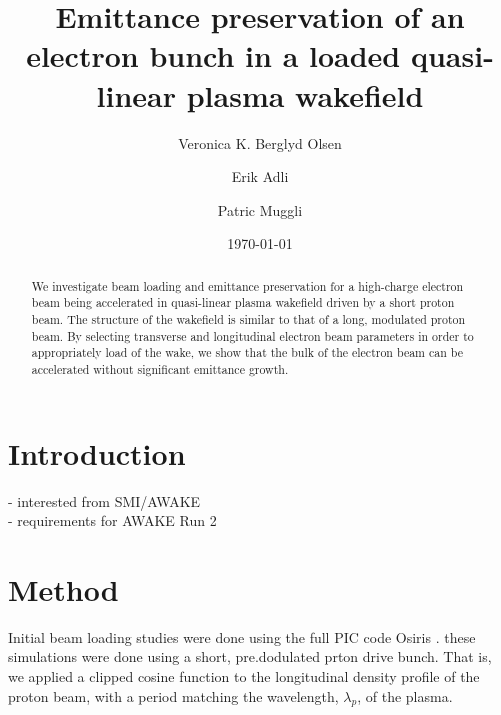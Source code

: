 \documentclass[aps,prstab,reprint,groupedaddress]{revtex4-1}
\begin{document}

\title{Emittance preservation of an electron bunch in a loaded quasi-linear plasma wakefield}

\author{Veronica K. Berglyd Olsen}

\author{Erik Adli}

\author{Patric Muggli}

\date{\today}

\begin{abstract}
We investigate beam loading and emittance preservation for a high-charge electron beam being accelerated in quasi-linear plasma wakefield driven by a short proton beam. The structure of the wakefield is similar to that of a long, modulated proton beam. By selecting transverse and longitudinal electron beam parameters in order to  appropriately load of the wake, we show that the bulk of the electron beam can be accelerated without significant emittance growth.
\end{abstract}

\maketitle

\section[\label{S:I}]{Introduction}

- interested from SMI/AWAKE \\
- requirements for AWAKE Run 2 \\

\section[\label{S:M}]{Method}

Initial beam loading studies were done using the full PIC code Osiris \cite{fonseca_osiris:_2002}. these simulations were done using a short, pre.dodulated prton drive bunch. That is, we applied a clipped cosine function to the longitudinal density profile of the proton beam, with a period matching the wavelength, $\lambda_p$, of the plasma.
\end{document}
